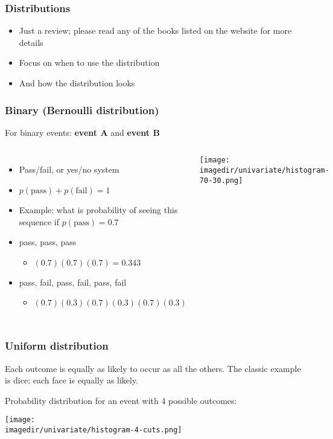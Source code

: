 \begin{frame}\frametitle{Distributions}
	\begin{itemize}
		\item	Just a review; please read any of the books listed on the website for more details
		\item	Focus on when to use the distribution
		\item	And how the distribution looks
	\end{itemize}
\end{frame}

\begin{frame}\frametitle{Binary (Bernoulli distribution)}
	For binary events: \textbf{event A} and \textbf{event B}
	\begin{columns}
		\column{6cm}
		\begin{itemize}
			\item	Pass/fail, or yes/no system
			\item	$p(\text{pass}) + p(\text{fail}) = 1$
			\item	Example: what is probability of seeing this sequence if $p(\text{pass}) = 0.7$
			\item	pass, pass, pass
			\begin{itemize}
				\item	$(0.7)(0.7)(0.7) = 0.343$
			\end{itemize}
			\item	pass, fail, pass, fail, pass, fail
			\begin{itemize}
				\item	$(0.7)(0.3)(0.7)(0.3)(0.7)(0.3)$
			\end{itemize}
		\end{itemize}
		\column{5cm}
		\texttt{[image: \\imagedir/univariate/histogram-70-30.png]}
	\end{columns}
\end{frame}

\begin{frame}\frametitle{Uniform distribution}
	Each outcome is equally as likely to occur as all the others. The classic example is dice: each face is equally as likely.

	Probability distribution for an event with 4 possible outcomes:
	\begin{center}
		\texttt{[image: \\imagedir/univariate/histogram-4-cuts.png]}
	\end{center}
\end{frame}

